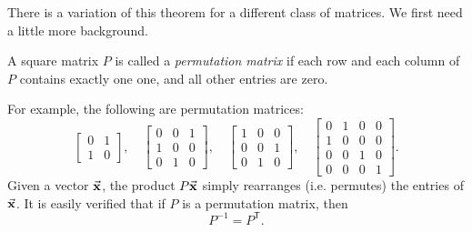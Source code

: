 \medskip

There is a variation of this theorem for a different
class of matrices.
We first need a little more background.
\begin{definition}
A square matrix $P$ is called a \emph{permutation matrix}
if each row and each column of $P$ contains exactly one one,
and all other entries are zero.
\end{definition}
For example, the following are permutation matrices:
\begin{equation}
  \begin{bmatrix}
      0 & 1 \\ 1 & 0
  \end{bmatrix},
  \quad
  \begin{bmatrix}
     0 & 0 & 1 \\ 1 & 0 & 0 \\ 0 & 1 & 0
  \end{bmatrix},
  \quad
  \begin{bmatrix}
     1 & 0 & 0 \\ 0 & 0 & 1 \\ 0 & 1 & 0
  \end{bmatrix},
  \quad
  \begin{bmatrix}
     0 & 1 & 0  & 0 \\ 1 & 0 & 0 & 0 \\ 0 & 0 & 1 & 0 \\ 0 & 0 & 0 & 1
  \end{bmatrix}.
\end{equation}
Given a vector $\vec{\textbf{x}}$, the product $P\vec{\textbf{x}}$ simply rearranges
(i.e. permutes) the entries of $\vec{\textbf{x}}$.
It is easily verified that if $P$ is a permutation matrix,
then
\begin{equation}
    P^{-1} = P^{\textsf{T}}.
\end{equation}

